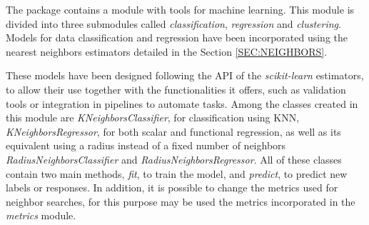 

The package contains a module with tools for machine learning.
This module is divided into three submodules called \textit{classification},
\textit{regression} and \textit{clustering}.
Models for data classification and regression have been incorporated using
the nearest neighbors estimators detailed in the Section \ref{SEC:NEIGHBORS}.

These models have been designed following the \acs{API} of the \textit{scikit-learn} estimators,
to allow their use together with the functionalities it offers, such as
validation tools or integration in pipelines to automate tasks.
Among the classes created in this module are \textit{KNeighborsClassifier},
for classification using \acs{KNN}, \textit{KNeighborsRegressor},
for both scalar and functional regression,
as well as its equivalent using a radius instead of a fixed number of neighbors
\textit{RadiusNeighborsClassifier} and \textit{RadiusNeighborsRegressor}.
All of these classes contain two main methods, \textit{fit}, to train the model,
and \textit{predict}, to predict new labels or responses.
In addition, it is possible to change the metrics used for neighbor searches,
for this purpose  may be used the metrics incorporated in the \textit{metrics}
module.
